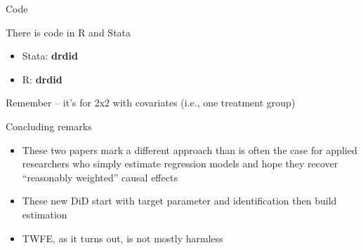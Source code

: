 \documentclass{beamer}
\begin{document}
\begin{frame}{Code}

There is code in R and Stata
\begin{itemize}
\item Stata: \textbf{drdid}
\item R: \textbf{drdid}
\end{itemize}
\bigskip
Remember -- it's for 2x2 with covariates (i.e., one treatment group)

\end{frame}




\begin{frame}{Concluding remarks}

\begin{itemize}
\item These two papers mark a different approach than is often the case for applied researchers who simply estimate regression models and hope they recover ``reasonably weighted'' causal effects
\item These new DiD start with target parameter and identification then build estimation
\item TWFE, as it turns out, is not mostly harmless
\end{itemize}

\end{frame}
\end{document}
